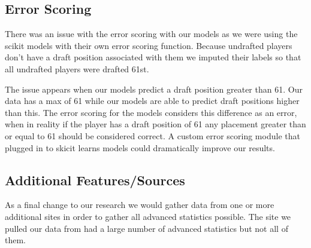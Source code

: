\documentclass{article}
\begin{document}
\subsection{Error Scoring}

There was an issue with the error scoring with our models as we were using the
scikit models with their own error scoring function. Because undrafted players
don’t have a draft position associated with them we imputed their labels so that
all undrafted players were drafted 61st. 

The issue appears when our models predict a draft position greater than 61. Our
data has a max of 61 while our models are able to predict draft positions higher
than this. The error scoring for the models considers this difference as an
error, when in reality if the player has a draft position of 61 any placement
greater than or equal to 61 should be considered correct. A custom error scoring
module that plugged in to skicit learns models could dramatically improve our
results.

\subsection{Additional Features/Sources}

As a final change to our research we would gather data from one or more
additional sites in order to gather all advanced statistics possible. The site
we pulled our data from had a large number of advanced statistics but not all of
them.
\end{document}
